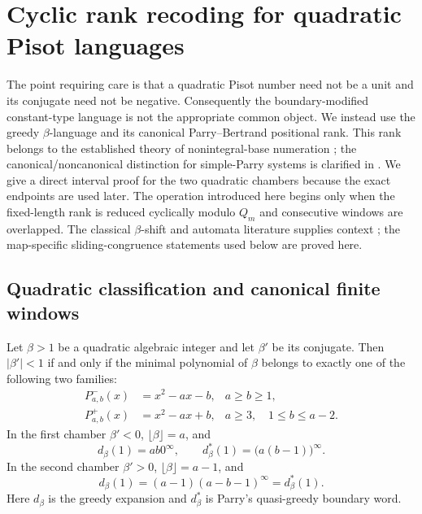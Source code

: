 \section{Cyclic rank recoding for quadratic Pisot languages}
\label{sec:quadratic-pisot-extension}

The point requiring care is that a quadratic Pisot number need not be a unit
and its conjugate need not be negative.  Consequently the boundary-modified
constant-type language is not the appropriate common object.  We instead use
the greedy $\beta$-language and its canonical Parry--Bertrand positional rank.
This rank belongs to the established theory of nonintegral-base numeration
\cite{BertrandMathis1989,BruyereHansel1997,LecomteRigo2001}; the
canonical/noncanonical distinction for simple-Parry systems is clarified in
\cite{CharlierCisterninoStipulanti2022}.  We give a direct interval proof for
the two quadratic chambers because the exact endpoints are used later.  The
operation introduced here begins only when the fixed-length rank is reduced
cyclically modulo $Q_m$ and consecutive windows are overlapped.  The
classical $\beta$-shift and automata literature supplies context
\cite{Renyi1957,ItoTakahashi1974,Parry1960,Blanchard1989,Loraud1995};
the map-specific sliding-congruence statements used below are proved here.

\subsection{Quadratic classification and canonical finite windows}

\begin{lemma}
\label{lem:quadratic-pisot-chambers}
Let $\beta>1$ be a quadratic algebraic integer and let $\beta'$ be its
conjugate.  Then $|\beta'|<1$ if and only if the minimal polynomial of
$\beta$ belongs to exactly one of the following two families:
\begin{align*}
P^-_{a,b}(x)&=x^2-ax-b, & a\ge b\ge1,\\
P^+_{a,b}(x)&=x^2-ax+b, & a\ge3,\quad 1\le b\le a-2.
\end{align*}
In the first chamber $\beta'<0$, $\lfloor\beta\rfloor=a$, and
\[
d_\beta(1)=ab0^\infty,\qquad
d_\beta^*(1)=\bigl(a(b-1)\bigr)^\infty.
\]
In the second chamber $\beta'>0$, $\lfloor\beta\rfloor=a-1$, and
\[
d_\beta(1)=(a-1)(a-b-1)^\infty=d_\beta^*(1).
\]
Here $d_\beta$ is the greedy expansion and $d_\beta^*$ is Parry's
quasi-greedy boundary word.
\end{lemma}

